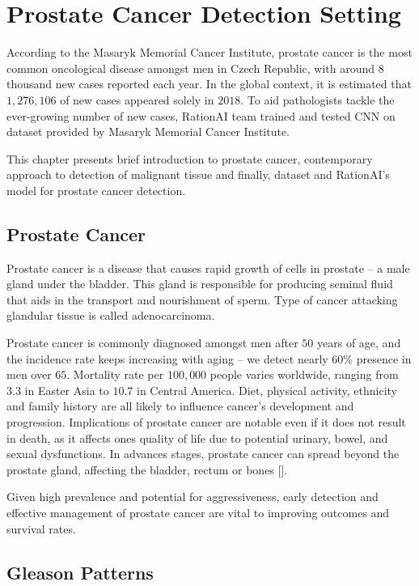 \chapter{Prostate Cancer Detection Setting}

According to the Masaryk Memorial Cancer Institute, prostate cancer is the most common oncological disease amongst men in Czech Republic, with around $8$ thousand new cases reported each year. In the global context, it is estimated that $1,276,106$ of new cases appeared solely in $2018$. To aid pathologists tackle the ever-growing number of new cases, RationAI team trained and tested CNN on dataset provided by Masaryk Memorial Cancer Institute.

This chapter presents brief introduction to prostate cancer, contemporary approach to detection of malignant tissue and finally, dataset and RationAI's model for prostate cancer detection.

\section{Prostate Cancer}

Prostate cancer is a disease that causes rapid growth of cells in prostate -- a male gland under the bladder. This gland is responsible for producing seminal fluid that aids in the transport and nourishment of sperm. Type of cancer attacking glandular tissue is called adenocarcinoma.

Prostate cancer is commonly diagnosed amongst men after $50$ years of age, and the incidence rate keeps increasing with aging -- we detect nearly $60$\% presence in men over $65$. Mortality rate per $100,000$ people varies worldwide, ranging from $3.3$ in Easter Asia to $10.7$ in Central America. Diet, physical activity, ethnicity and family history are all likely to influence cancer's development and progression. Implications of prostate cancer are notable even if it does not result in death, as it affects ones quality of life due to potential urinary, bowel, and sexual dysfunctions. In advances stages, prostate cancer can spread beyond the prostate gland, affecting the bladder, rectum or bones [].

Given high prevalence and potential for aggressiveness, early detection and effective management of prostate cancer are vital to improving outcomes and survival rates.

\section{Gleason Patterns}

